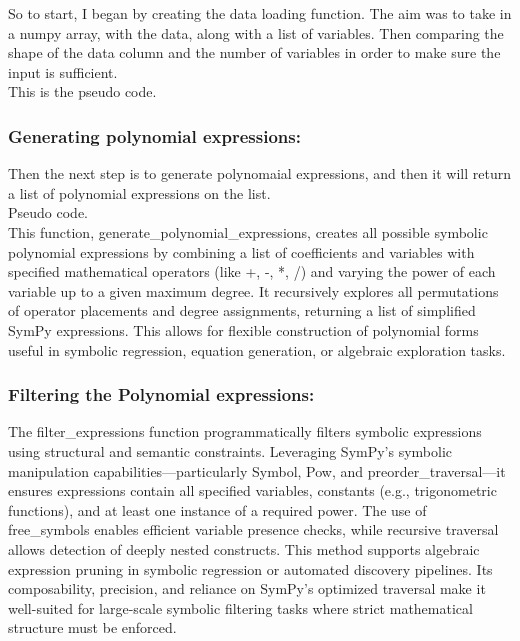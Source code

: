 \documentclass{article}
\begin{document}
So to start, I began by creating the data loading function. The aim was to take in a numpy array, with the data, along with a list of variables. Then comparing the shape of the data column and the number of variables in order to make sure the input is sufficient. \\

This is the pseudo code.\\

\subsubsection{Generating polynomial expressions: }

Then the next step is to generate polynomaial expressions, and then it will return a list of polynomial expressions on the list. \\ 

Pseudo code.\\ 

This function, generate_polynomial_expressions, creates all possible symbolic polynomial expressions by combining a list of coefficients and variables with specified mathematical operators (like +, -, *, /) and varying the power of each variable up to a given maximum degree. It recursively explores all permutations of operator placements and degree assignments, returning a list of simplified SymPy expressions. This allows for flexible construction of polynomial forms useful in symbolic regression, equation generation, or algebraic exploration tasks.\\

\subsubsection{Filtering the Polynomial expressions: }

The filter_expressions function programmatically filters symbolic expressions using structural and semantic constraints. Leveraging SymPy’s symbolic manipulation capabilities—particularly Symbol, Pow, and preorder_traversal—it ensures expressions contain all specified variables, constants (e.g., trigonometric functions), and at least one instance of a required power. The use of free_symbols enables efficient variable presence checks, while recursive traversal allows detection of deeply nested constructs. This method supports algebraic expression pruning in symbolic regression or automated discovery pipelines. Its composability, precision, and reliance on SymPy's optimized traversal make it well-suited for large-scale symbolic filtering tasks where strict mathematical structure must be enforced.\\
\end{document}
